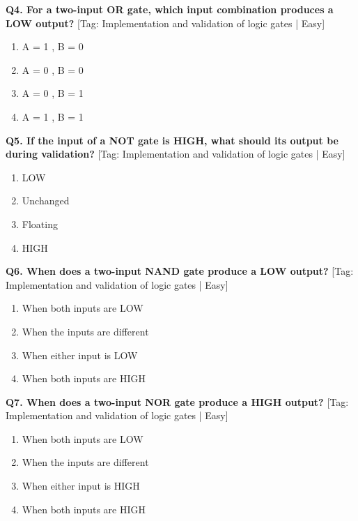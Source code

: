 \noindent\textbf{Q4. For a two-input OR gate, which input combination produces a LOW output?} \hfill [Tag: Implementation and validation of logic gates | Easy]
\begin{enumerate}[label=(\alph*),topsep=2pt,itemsep=1pt,partopsep=0pt,parsep=0pt]
    \item {A = 1 , B = 0}
    \item {A = 0 , B = 0}
    \item {A = 0 , B = 1}
    \item {A = 1 , B = 1}
\end{enumerate}
\vspace{2mm}

\noindent\textbf{Q5. If the input of a NOT gate is HIGH, what should its output be during validation?} \hfill [Tag: Implementation and validation of logic gates | Easy]
\begin{enumerate}[label=(\alph*),topsep=2pt,itemsep=1pt,partopsep=0pt,parsep=0pt]
    \item {LOW}
    \item {Unchanged}
    \item {Floating}
    \item {HIGH}
\end{enumerate}
\vspace{2mm}

\noindent\textbf{Q6. When does a two-input NAND gate produce a LOW output?} \hfill [Tag: Implementation and validation of logic gates | Easy]
\begin{enumerate}[label=(\alph*),topsep=2pt,itemsep=1pt,partopsep=0pt,parsep=0pt]
    \item {When both inputs are LOW}
    \item {When the inputs are different}
    \item {When either input is LOW}
    \item {When both inputs are HIGH}
\end{enumerate}
\vspace{2mm}

\noindent\textbf{Q7. When does a two-input NOR gate produce a HIGH output?} \hfill [Tag: Implementation and validation of logic gates | Easy]
\begin{enumerate}[label=(\alph*),topsep=2pt,itemsep=1pt,partopsep=0pt,parsep=0pt]
    \item {When both inputs are LOW}
    \item {When the inputs are different}
    \item {When either input is HIGH}
    \item {When both inputs are HIGH}
\end{enumerate}
\vspace{2mm}

